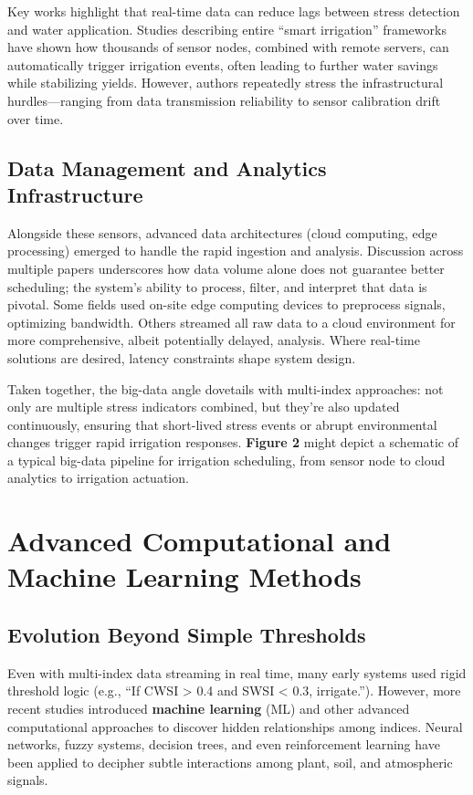 \documentclass[12pt]{article}
\begin{document}
Key works highlight that real-time data can reduce lags between stress detection and water application. Studies describing entire “smart irrigation” frameworks have shown how thousands of sensor nodes, combined with remote servers, can automatically trigger irrigation events, often leading to further water savings while stabilizing yields. However, authors repeatedly stress the infrastructural hurdles—ranging from data transmission reliability to sensor calibration drift over time.

\subsection{Data Management and Analytics Infrastructure}
Alongside these sensors, advanced data architectures (cloud computing, edge processing) emerged to handle the rapid ingestion and analysis. Discussion across multiple papers underscores how data volume alone does not guarantee better scheduling; the system’s ability to process, filter, and interpret that data is pivotal. Some fields used on-site edge computing devices to preprocess signals, optimizing bandwidth. Others streamed all raw data to a cloud environment for more comprehensive, albeit potentially delayed, analysis. Where real-time solutions are desired, latency constraints shape system design.

Taken together, the big-data angle dovetails with multi-index approaches: not only are multiple stress indicators combined, but they’re also updated continuously, ensuring that short-lived stress events or abrupt environmental changes trigger rapid irrigation responses. \textbf{Figure 2} might depict a schematic of a typical big-data pipeline for irrigation scheduling, from sensor node to cloud analytics to irrigation actuation.



\section{Advanced Computational and Machine Learning Methods}

\subsection{Evolution Beyond Simple Thresholds}
Even with multi-index data streaming in real time, many early systems used rigid threshold logic (e.g., “If CWSI > 0.4 and SWSI < 0.3, irrigate.”). However, more recent studies introduced \textbf{machine learning} (ML) and other advanced computational approaches to discover hidden relationships among indices. Neural networks, fuzzy systems, decision trees, and even reinforcement learning have been applied to decipher subtle interactions among plant, soil, and atmospheric signals.
\end{document}

